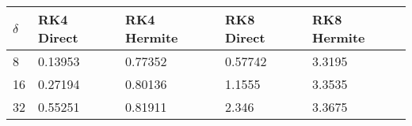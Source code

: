 \begin{tabular}{lllll}
\hline
$\delta$ & RK4 Direct & RK4 Hermite & RK8 Direct & RK8 Hermite \\ 
\hline 
8 & 0.13953 & 0.77352 & 0.57742 & 3.3195 \\ 
16 & 0.27194 & 0.80136 & 1.1555 & 3.3535 \\ 
32 & 0.55251 & 0.81911 & 2.346 & 3.3675 \\ 
\hline 
\end{tabular}